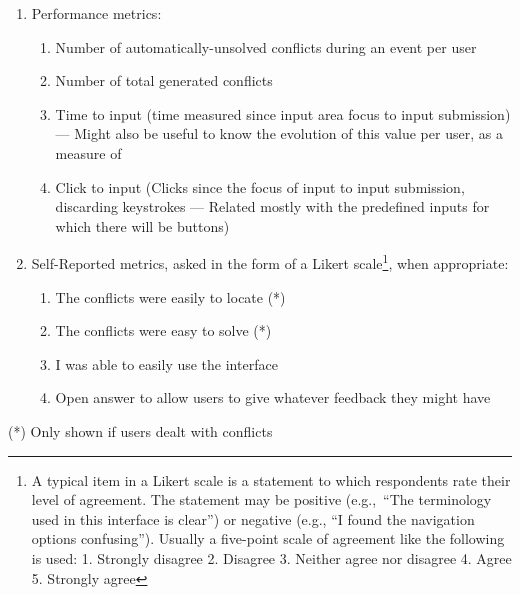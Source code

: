 \begin{enumerate}
    \item Performance metrics:
    \begin{enumerate}
        \item Number of automatically-unsolved conflicts during an event per user
        \item Number of total generated conflicts
        \item Time to input (time measured since input area focus to input submission) --- Might also be useful to know the evolution of this value per user, as a measure of 
        \item Click to input (Clicks since the focus of input to input submission, discarding keystrokes --- Related mostly with the predefined inputs for which there will be buttons)
    \end{enumerate}
    \item Self-Reported metrics, asked in the form of a Likert scale\footnote{A typical item in a Likert scale is a statement to which respondents rate
    their level of agreement. The statement may be positive (e.g.,\ “The terminology used in this interface is clear”) or negative (e.g., “I found the navigation options confusing”). Usually a five-point scale of agreement like the following is used: 1. Strongly disagree 2. Disagree 3. Neither agree nor disagree 4. Agree 5. Strongly agree}, when appropriate:
    \begin{enumerate}
        \item The conflicts were easily to locate (*)
        \item The conflicts were easy to solve (*)
        \item I was able to easily use the interface \\
        \item Open answer to allow users to give whatever feedback they might have
    \end{enumerate}
\end{enumerate}

(*) Only shown if users dealt with conflicts
